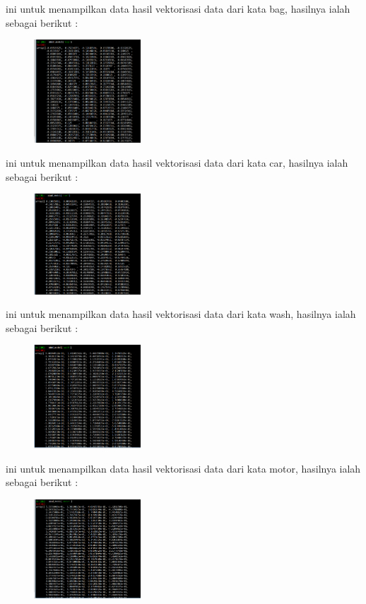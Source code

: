 \begin{enumerate}
	\hfill\break
	
	ini untuk menampilkan data hasil vektorisasi data dari kata bag, hasilnya ialah sebagai berikut : 
	\begin{figure}[H]
	\centering
		\includegraphics[width=4cm]{figures/1174073/tugas5/materi/hasil1_8.PNG}
	\end{figure}

	\hfill\break
	
	ini untuk menampilkan data hasil vektorisasi data dari kata car, hasilnya ialah sebagai berikut : 
	\begin{figure}[H]
	\centering
		\includegraphics[width=4cm]{figures/1174073/tugas5/materi/hasil1_9.PNG}
	\end{figure}

	\hfill\break
	
	ini untuk menampilkan data hasil vektorisasi data dari kata wash, hasilnya ialah sebagai berikut : 
	\begin{figure}[H]
	\centering
		\includegraphics[width=4cm]{figures/1174073/tugas5/materi/hasil1_10.PNG}
	\end{figure}

	\hfill\break
	
	ini untuk menampilkan data hasil vektorisasi data dari kata motor, hasilnya ialah sebagai berikut : 
	\begin{figure}[H]
	\centering
		\includegraphics[width=4cm]{figures/1174073/tugas5/materi/hasil1_11.PNG}
	\end{figure}


\end{enumerate}
